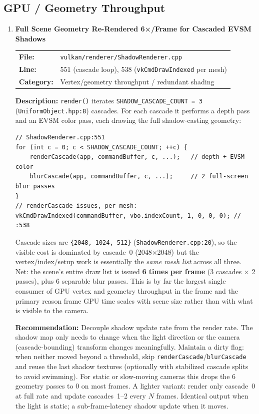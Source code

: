 \documentclass[a4paper,12pt]{article}
\newcommand{\severitybox}[2]{%
  \colorbox{#1}{\makebox[2.5cm][c]{\textcolor{white}{\textbf{#2}}}}%
}
\begin{document}
\subsection{GPU / Geometry Throughput}

\begin{enumerate}[leftmargin=*]

\item[\textbf{[N1]}] \textbf{Full Scene Geometry Re-Rendered 6×/Frame for Cascaded EVSM Shadows}
  \hfill \severitybox{highcolor}{HIGH}

  \begin{tabular}{ll}
    \textbf{File:} & \texttt{vulkan/renderer/ShadowRenderer.cpp} \\
    \textbf{Line:} & 551 (cascade loop), 538 (\texttt{vkCmdDrawIndexed} per mesh) \\
    \textbf{Category:} & Vertex/geometry throughput / redundant shading \\
  \end{tabular}

  \textbf{Description:}
  \texttt{render()} iterates \texttt{SHADOW\_CASCADE\_COUNT = 3}
  (\texttt{UniformObject.hpp:8}) cascades. For each cascade it performs a depth
  pass and an EVSM color pass, each drawing the full shadow-casting geometry:

\begin{lstlisting}
// ShadowRenderer.cpp:551
for (int c = 0; c < SHADOW_CASCADE_COUNT; ++c) {
    renderCascade(app, commandBuffer, c, ...);   // depth + EVSM color
    blurCascade(app, commandBuffer, c, ...);     // 2 full-screen blur passes
}
// renderCascade issues, per mesh:
vkCmdDrawIndexed(commandBuffer, vbo.indexCount, 1, 0, 0, 0); // :538
\end{lstlisting}

  Cascade sizes are \texttt{\{2048, 1024, 512\}}
  (\texttt{ShadowRenderer.cpp:20}), so the visible cost is dominated by cascade~0
  (2048×2048) but the vertex/index/setup work is essentially the \emph{same mesh
  list} across all three. Net: the scene's entire draw list is issued
  \textbf{6 times per frame} (3 cascades × 2 passes), plus 6 separable blur
  passes. This is by far the largest single consumer of GPU vertex and geometry
  throughput in the frame and the primary reason frame GPU time scales with
  scene size rather than with what is visible to the camera.

  \textbf{Recommendation:}
  Decouple shadow update rate from the render rate. The shadow map only needs to
  change when the light direction or the camera (cascade-bounding) transform
  changes meaningfully. Maintain a dirty flag: when neither moved beyond a
  threshold, skip \texttt{renderCascade}/\texttt{blurCascade} and reuse the last
  shadow textures (optionally with stabilized cascade splits to avoid swimming).
  For static or slow-moving cameras this drops the 6 geometry passes to 0 on most
  frames. A lighter variant: render only cascade~0 at full rate and update
  cascades~1–2 every $N$ frames. Identical output when the light is static; a
  sub-frame-latency shadow update when it moves.


\end{enumerate}
\end{document}
